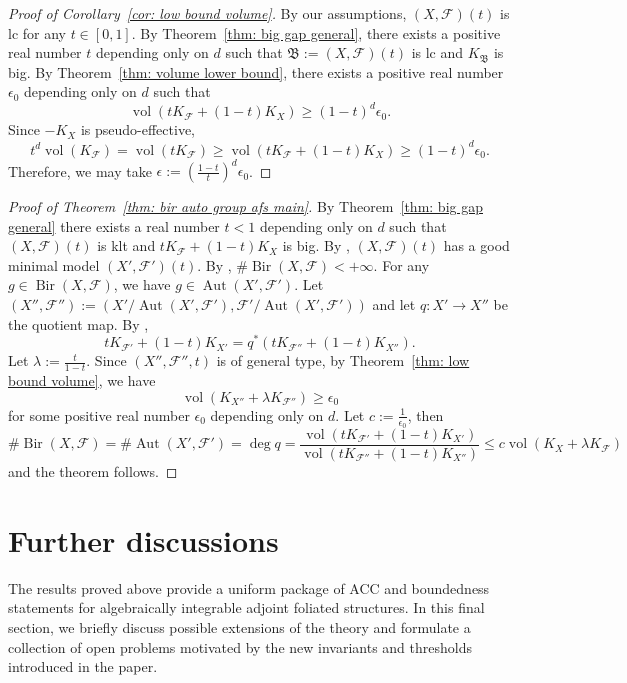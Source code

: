 \documentclass[11pt,reqno]{amsart}
\numberwithin{equation}{section}
\newcommand{\vol}{\operatorname{vol}}
\newcommand{\Bir}{\operatorname{Bir}}
\newcommand{\Aut}{\operatorname{Aut}}
\newcommand{\Bb}{{\mathfrak{B}}}
\newcommand{\Ff}{\mathcal{F}}
\theoremstyle{definition}
\begin{document}
\begin{proof}[Proof of Corollary~\ref{cor: low bound volume}]
By our assumptions, $(X,\Ff)(t)$ is lc for any $t\in [0,1]$. By Theorem~\ref{thm: big gap general}, there exists a positive real number $t$ depending only on $d$ such that $\Bb:=(X,\Ff)(t)$ is lc and $K_{\Bb}$ is big. By Theorem~\ref{thm: volume lower bound}, there exists a positive real number $\epsilon_0$ depending only on $d$ such that
$$\vol(tK_{\Ff}+(1-t)K_X)\geq (1-t)^d\epsilon_0.$$
Since $-K_X$ is pseudo-effective,
$$t^d\vol(K_{\Ff})=\vol(tK_{\Ff})\geq\vol(tK_{\Ff}+(1-t)K_X)\geq(1-t)^d\epsilon_0.$$
Therefore, we may take $\epsilon:=\left(\frac{1-t}{t}\right)^d\epsilon_0$.
\end{proof}


\begin{proof}[Proof of Theorem~\ref{thm: bir auto group afs main}]
By Theorem~\ref{thm: big gap general} there exists a real number $t<1$ depending only on $d$ such that $(X,\Ff)(t)$ is klt and $tK_{\Ff}+(1-t)K_X$ is big. By \cite[Theorem~2.1.1]{Cas+25a}, $(X,\Ff)(t)$ has a good minimal model $(X',\Ff')(t)$. By \cite[Theorem~1]{PS02}, $\#\Bir(X,\Ff)<+\infty$. For any $g\in\Bir(X,\Ff)$, we have $g\in\Aut(X',\Ff')$. Let $(X'',\Ff''):=(X'/\Aut(X',\Ff'),\Ff'/\Aut(X',\Ff'))$ and let $q\colon X'\rightarrow X''$ be the quotient map. By \cite[Lemma~3.4]{Dru21},
$$tK_{\Ff'}+(1-t)K_{X'}=q^*(tK_{\Ff''}+(1-t)K_{X''}).$$
Let $\lambda:=\frac{t}{1-t}$. Since $(X'',\Ff'',t)$ is of general type, by Theorem~\ref{thm: low bound volume}, we have
$$\vol\left(K_{X''}+\lambda K_{\Ff''}\right)\geq\epsilon_0$$
for some positive real number $\epsilon_0$ depending only on $d$. Let $c:=\frac{1}{\epsilon_0}$, then
$$\#\Bir(X,\Ff)=\#\Aut(X',\Ff')=\deg q=\frac{\vol(tK_{\Ff'}+(1-t)K_{X'})}{\vol(tK_{\Ff''}+(1-t)K_{X''})}\leq c\vol\left(K_X+\lambda K_{\Ff}\right)$$
and the theorem follows.
\end{proof}


\section{Further discussions}\label{sec: discussion}


The results proved above provide a uniform package of ACC and boundedness statements for algebraically integrable adjoint foliated structures. 
In this final section, we briefly discuss possible extensions of the theory and formulate a collection of open problems motivated by the new invariants and thresholds introduced in the paper.
\end{document}
